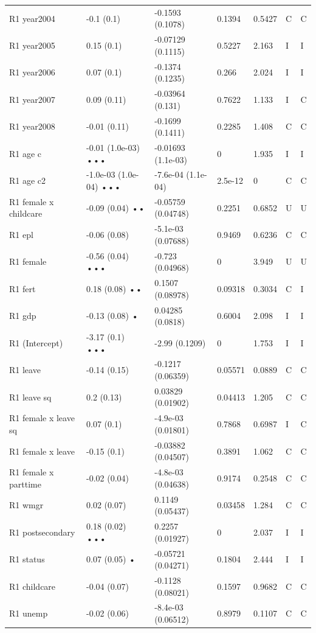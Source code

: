 {\begin{longtable}{@{}p{.245\linewidth}p{.17\linewidth}p{.17\linewidth}p{.085\linewidth}p{.060\linewidth}p{.08\linewidth}p{.07\linewidth}@{}}
R1 year2004 & -0.1 (0.1) & -0.1593 (0.1078) & 0.1394 & 0.5427 & C & C\\
R1 year2005 & 0.15 (0.1) & -0.07129 (0.1115) & 0.5227 & 2.163 & I & I\\
R1 year2006 & 0.07 (0.1) & -0.1374 (0.1235) & 0.266 & 2.024 & I & I\\
R1 year2007 & 0.09 (0.11) & -0.03964 (0.131) & 0.7622 & 1.133 & I & C\\
R1 year2008 & -0.01 (0.11) & -0.1699 (0.1411) & 0.2285 & 1.408 & C & C\\
R1 age c & -0.01 (1.0e-03) ••• & -0.01693 (1.1e-03) & 0 & 1.935 & I & I\\
R1 age c2 & -1.0e-03 (1.0e-04) ••• & -7.6e-04 (1.1e-04) & 2.5e-12 & 0 & C & C\\
R1 female x childcare & -0.09 (0.04) •• & -0.05759 (0.04748) & 0.2251 & 0.6852 & U & U\\
R1 epl & -0.06 (0.08) & -5.1e-03 (0.07688) & 0.9469 & 0.6236 & C & C\\
R1 female & -0.56 (0.04) ••• & -0.723 (0.04968) & 0 & 3.949 & U & U\\
R1 fert & 0.18 (0.08) •• & 0.1507 (0.08978) & 0.09318 & 0.3034 & C & I\\
R1 gdp & -0.13 (0.08) • & 0.04285 (0.0818) & 0.6004 & 2.098 & I & I\\
R1 (Intercept) & -3.17 (0.1) ••• & -2.99 (0.1209) & 0 & 1.753 & I & I\\
R1 leave & -0.14 (0.15) & -0.1217 (0.06359) & 0.05571 & 0.0889 & C & C\\
R1 leave sq & 0.2 (0.13) & 0.03829 (0.01902) & 0.04413 & 1.205 & C & C\\
R1 female x leave sq & 0.07 (0.1) & -4.9e-03 (0.01801) & 0.7868 & 0.6987 & I & C\\
R1 female x leave & -0.15 (0.1) & -0.03882 (0.04507) & 0.3891 & 1.062 & C & C\\
R1 female x parttime & -0.02 (0.04) & -4.8e-03 (0.04638) & 0.9174 & 0.2548 & C & C\\
R1 wmgr & 0.02 (0.07) & 0.1149 (0.05437) & 0.03458 & 1.284 & C & C\\
R1 postsecondary & 0.18 (0.02) ••• & 0.2257 (0.01927) & 0 & 2.037 & I & I\\
R1 status & 0.07 (0.05) • & -0.05721 (0.04271) & 0.1804 & 2.444 & I & I\\
R1 childcare & -0.04 (0.07) & -0.1128 (0.08021) & 0.1597 & 0.9682 & C & C\\
R1 unemp & -0.02 (0.06) & -8.4e-03 (0.06512) & 0.8979 & 0.1107 & C & C\\

\end{longtable}}
